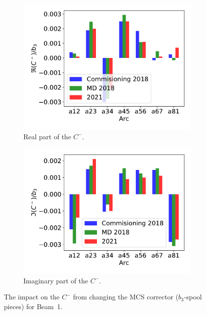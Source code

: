 \documentclass[a4paper]{cernatsnote}
\begin{document}
\begin{figure}[ht]
\begin{subfigure}{.5\textwidth}
  \centering
  \includegraphics[width=.8\linewidth]{plots/MCS/b2_change_re_per_b3.pdf}  
  \caption{Real part of the $C^-$.}
\end{subfigure}
\begin{subfigure}{.5\textwidth}
  \centering
  \includegraphics[width=.8\linewidth]{plots/MCS/b_2change_im_per_b3.pdf}  
  \caption{Imaginary part of the $C^-$.}
\end{subfigure}
\caption{The impact on the $C^-$ from changing the MCS corrector ($b_3$-spool pieces) for Beam~1.}
\label{fig:beam2_mcs}
\end{figure}
\end{document}
